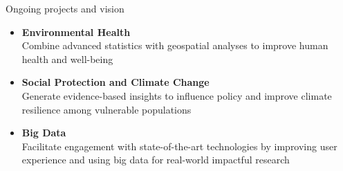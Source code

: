 \begin{rSection}{Ongoing projects and vision}
\begin{itemize}

\item{\textbf{Environmental Health}}\\
{Combine advanced statistics with geospatial analyses to improve human health and well-being}

\item{\textbf{Social Protection and Climate Change}}\\ 
{Generate evidence-based insights to influence policy and improve climate resilience among vulnerable populations}

\item{\textbf{Big Data}}\\
{Facilitate engagement with state-of-the-art technologies by improving user experience and using big data for real-world impactful research}

\end{itemize}
\end{rSection}
